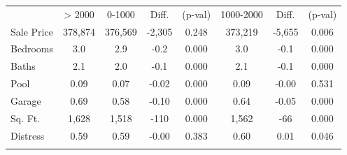 \begin{center}
\begin{tabular}{lccccccc}
\hline \noalign{\smallskip} & > 2000 & 0-1000  & Diff. & (p-val) & 1000-2000 & Diff. & (p-val)\\
\noalign{\smallskip}\hline Sale Price & 378,874 & 376,569 & -2,305 & 0.248 & 373,219 & -5,655 & 0.006\\
Bedrooms & 3.0 & 2.9 & -0.2 & 0.000 & 3.0 & -0.1 & 0.000\\
Baths & 2.1 & 2.0 & -0.1 & 0.000 & 2.1 & -0.1 & 0.000\\
Pool & 0.09 & 0.07 & -0.02 & 0.000 & 0.09 & -0.00 & 0.531\\
Garage & 0.69 & 0.58 & -0.10 & 0.000 & 0.64 & -0.05 & 0.000\\
Sq. Ft. & 1,628 & 1,518 & -110 & 0.000 & 1,562 & -66 & 0.000\\
\noalign{\smallskip}Distress & 0.59 & 0.59 & -0.00 & 0.383 & 0.60 & 0.01 & 0.046\\
\noalign{\smallskip}\hline\end{tabular}\\
\end{center}
